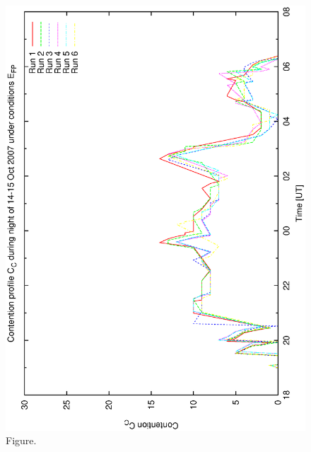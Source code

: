 \documentclass[12pt,a4paper]{article}
\begin{document}
\begin{figure}[htbp]
 \begin{center}
  \includegraphics[scale=1.0, angle=0]{figures/bsa_pr_cont.eps}
 \end{center}
  \caption[Figure.]
{Figure.}
\end{figure}
\clearpage
\end{document}
